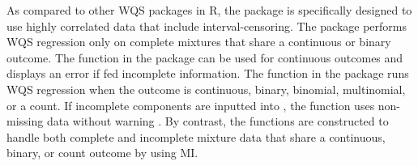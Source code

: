 As compared to other WQS packages in R, the  package is
specifically designed to use highly correlated data that include
interval-censoring. The 
\citep{czarnotaWqsWeightedQuantile2015} package performs WQS regression
only on complete mixtures that share a continuous or binary outcome. The
 function in the  package can be used for
continuous outcomes and displays an error if fed incomplete information.
The  function in the  package runs WQS
regression when the outcome is continuous, binary, binomial,
multinomial, or a count. If incomplete components are inputted into
, the function uses non-missing data without warning
\citep{renzettiGWQSGeneralizedWeighted2020a}. By contrast, the
 functions are constructed to handle both complete and
incomplete mixture data that share a continuous, binary, or count
outcome by using MI.

